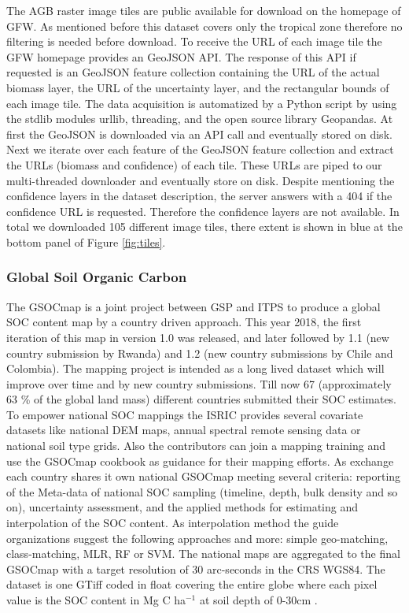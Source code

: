 			The \ac{AGB} raster image tiles are public available for download on the homepage of \ac{GFW}. As mentioned before this dataset covers only the tropical zone therefore no filtering is needed before download. To receive the \ac{URL} of each image tile the \ac{GFW} homepage provides an \ac{GeoJSON} \ac{API}. The response of this \ac{API} if requested is an \ac{GeoJSON} feature collection containing the \ac{URL} of the actual biomass layer, the \ac{URL} of the uncertainty layer, and the rectangular bounds of each image tile. The data acquisition is automatized by a Python script by using the \ac{stdlib} modules urllib, threading, and the open source library Geopandas. At first the \ac{GeoJSON} is downloaded via an \ac{API} call and eventually stored on disk. Next we iterate over each feature of the \ac{GeoJSON} feature collection and extract the \ac{URL}s (biomass and confidence) of each tile. These \ac{URL}s are piped to our multi-threaded downloader and eventually store on disk. Despite mentioning the confidence layers in the dataset description, the server answers with a 404 if the confidence \ac{URL} is requested. Therefore the confidence layers are not available. In total we downloaded 105 different image tiles, there extent is shown in blue at the bottom panel of Figure \ref{fig:tiles}.

		\subsubsection{Global Soil Organic Carbon}
			The \ac{GSOCmap} is a joint project between \ac{GSP} and \ac{ITPS} to produce a global \ac{SOC} content map by a country driven approach. This year 2018, the first iteration of this map in version 1.0 was released, and later followed by 1.1 (new country submission by Rwanda) and 1.2 (new country submissions by Chile and Colombia). The mapping project is intended as a long lived dataset which will improve over time and by new country submissions. Till now 67 (approximately 63 \% of the global land mass) different countries submitted their \ac{SOC} estimates. To empower national \ac{SOC} mappings the \ac{ISRIC} provides several covariate datasets like national \ac{DEM} maps, annual spectral remote sensing data or national soil type grids. Also the contributors can join a mapping training and use the \ac{GSOCmap} cookbook as guidance for their mapping efforts. As exchange each country shares it own national \ac{GSOCmap} meeting several criteria: reporting of the Meta-data of national \ac{SOC} sampling (timeline, depth, bulk density and so on), uncertainty assessment, and the applied methods for estimating and interpolation of the \ac{SOC} content. As interpolation method the guide organizations suggest the following approaches and more: simple geo-matching, class-matching, \ac{MLR}, \ac{RF} or \ac{SVM}. The national maps are aggregated to the final \ac{GSOCmap} with a target resolution of 30 arc-seconds in the \ac{CRS} \ac{WGS84}. The dataset is one \ac{GTiff} coded in float covering the entire globe where each pixel value is the \ac{SOC} content in Mg C ha$^{-1}$ at soil depth of 0-30cm \citep{FAO2018}.

